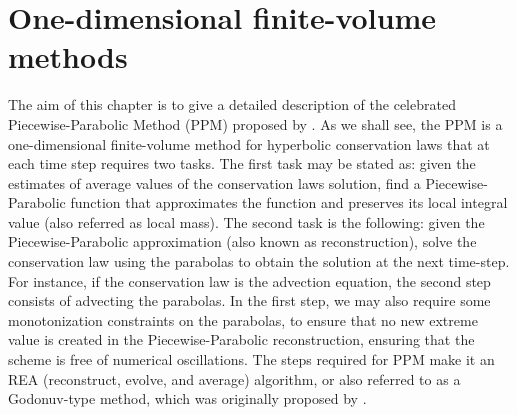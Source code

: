 \chapter{One-dimensional finite-volume methods}
\label{chp-1d-fv}

\theoremstyle{plain}
\newtheorem{lema}{Lemma}[chapter]

\theoremstyle{plain}
\newtheorem{prop}{Proposition}[chapter]

\theoremstyle{plain}
\newtheorem{thrm}{Theorem}[chapter]

\theoremstyle{plain}
\newtheorem{remark}{Remark}[chapter]

\theoremstyle{plain}
\newtheorem{corollary}{Corollary}[chapter]

\theoremstyle{plain}
\newtheorem{definition}{Definition}[chapter]


The aim of this chapter is to give a detailed description of the celebrated
Piecewise-Parabolic Method (PPM) proposed by \citet{colella:1984}.
As we shall see, the PPM is a one-dimensional finite-volume method for
hyperbolic conservation laws that at each time step requires two tasks. 
The first task may be stated as: given the estimates of average values of the
conservation laws solution, find a Piecewise-Parabolic function that approximates 
the function and preserves its local integral value (also referred as local mass).
The second task is the following: given the Piecewise-Parabolic approximation 
(also known as reconstruction), solve the conservation law using the parabolas 
to obtain the solution at the next time-step.
For instance, if the conservation law is the advection equation, the second step
consists of advecting the parabolas.
In the first step, we may also require some monotonization constraints on the parabolas,
to ensure that no new extreme value is created in the Piecewise-Parabolic reconstruction, 
ensuring that the scheme is free of numerical oscillations.
The steps required for PPM make it an REA (reconstruct, evolve, and average) algorithm,
or also referred to as a Godonuv-type method, which was originally proposed by 
\citet{godunov:1959}.

